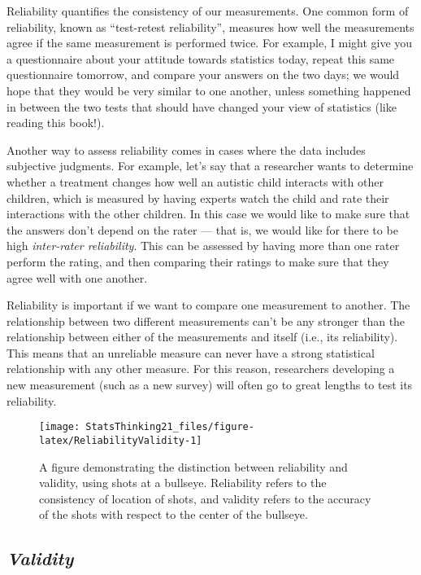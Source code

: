 \documentclass[]{book}
\theoremstyle{definition}
\theoremstyle{definition}
\theoremstyle{definition}
\theoremstyle{remark}
\begin{document}
Reliability quantifies the consistency of our measurements. One common
form of reliability, known as ``test-retest reliability'', measures how
well the measurements agree if the same measurement is performed twice.
For example, I might give you a questionnaire about your attitude
towards statistics today, repeat this same questionnaire tomorrow, and
compare your answers on the two days; we would hope that they would be
very similar to one another, unless something happened in between the
two tests that should have changed your view of statistics (like reading
this book!).

Another way to assess reliability comes in cases where the data includes
subjective judgments. For example, let's say that a researcher wants to
determine whether a treatment changes how well an autistic child
interacts with other children, which is measured by having experts watch
the child and rate their interactions with the other children. In this
case we would like to make sure that the answers don't depend on the
rater --- that is, we would like for there to be high \emph{inter-rater
reliability}. This can be assessed by having more than one rater perform
the rating, and then comparing their ratings to make sure that they
agree well with one another.

Reliability is important if we want to compare one measurement to
another. The relationship between two different measurements can't be
any stronger than the relationship between either of the measurements
and itself (i.e., its reliability). This means that an unreliable
measure can never have a strong statistical relationship with any other
measure. For this reason, researchers developing a new measurement (such
as a new survey) will often go to great lengths to test its reliability.

\begin{figure}
\texttt{[image: StatsThinking21\_files/figure-latex/ReliabilityValidity-1]} \caption{A figure demonstrating the distinction between reliability and validity, using shots at a bullseye. Reliability refers to the consistency of location of shots, and validity refers to the accuracy of the shots with respect to the center of the bullseye. }\label{fig:ReliabilityValidity}
\end{figure}

\subsection{\texorpdfstring{\emph{Validity}}{Validity}}\label{validity}
\end{document}

